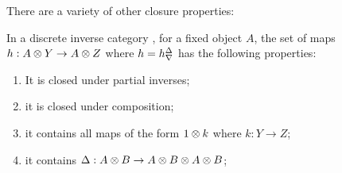 There are a variety of other closure properties:
\begin{lemma}\label{lem:delta_nabla_maps_are_closed}
  In a discrete inverse category \X, for a fixed object $A$, the set of maps $h:A\otimes Y\to A\otimes Z$ where
  $h={h}^{\Delta}_{\nabla}$ has the following properties:
  \begin{enumerate}[{(}i{)}]
  \item It is closed under partial inverses;\label{lemitem:delta_nabla_1}
  \item it is closed under composition;\label{lemitem:delta_nabla_2}
  \item it contains all maps of the form $1\otimes k$ where $k:Y\to Z$;\label{lemitem:delta_nabla_3}
  \item it contains $\Delta:A\otimes B \to A\otimes B\otimes A\otimes B$;\label{lemitem:delta_nabla_4}
  \end{enumerate}
\end{lemma}
